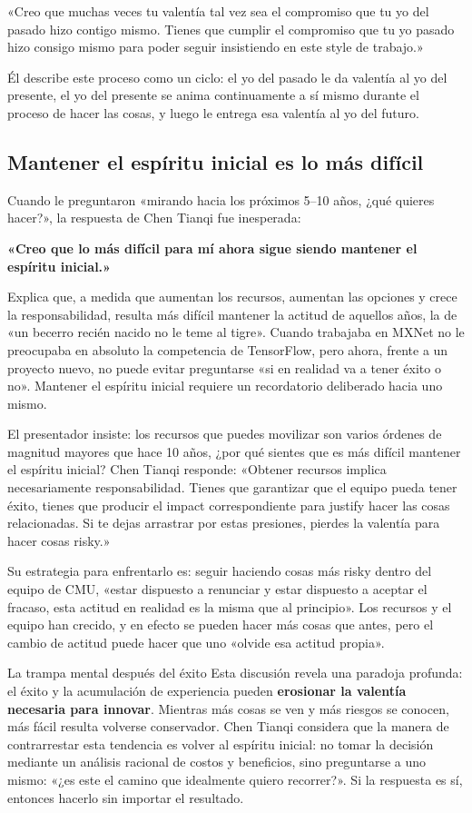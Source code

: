 «Creo que muchas veces tu valentía tal vez sea el compromiso que tu yo del pasado hizo contigo mismo. Tienes que cumplir el compromiso que tu yo pasado hizo consigo mismo para poder seguir insistiendo en este style de trabajo.»

Él describe este proceso como un ciclo: el yo del pasado le da valentía al yo del presente, el yo del presente se anima continuamente a sí mismo durante el proceso de hacer las cosas, y luego le entrega esa valentía al yo del futuro.

\subsection{Mantener el espíritu inicial es lo más difícil}

Cuando le preguntaron «mirando hacia los próximos 5--10 años, ¿qué quieres hacer?», la respuesta de Chen Tianqi fue inesperada:

\textbf{«Creo que lo más difícil para mí ahora sigue siendo mantener el espíritu inicial.»}

Explica que, a medida que aumentan los recursos, aumentan las opciones y crece la responsabilidad, resulta más difícil mantener la actitud de aquellos años, la de «un becerro recién nacido no le teme al tigre». Cuando trabajaba en MXNet no le preocupaba en absoluto la competencia de TensorFlow, pero ahora, frente a un proyecto nuevo, no puede evitar preguntarse «si en realidad va a tener éxito o no». Mantener el espíritu inicial requiere un recordatorio deliberado hacia uno mismo.

El presentador insiste: los recursos que puedes movilizar son varios órdenes de magnitud mayores que hace 10 años, ¿por qué sientes que es más difícil mantener el espíritu inicial? Chen Tianqi responde: «Obtener recursos implica necesariamente responsabilidad. Tienes que garantizar que el equipo pueda tener éxito, tienes que producir el impact correspondiente para justify hacer las cosas relacionadas. Si te dejas arrastrar por estas presiones, pierdes la valentía para hacer cosas risky.»

Su estrategia para enfrentarlo es: seguir haciendo cosas más risky dentro del equipo de CMU, «estar dispuesto a renunciar y estar dispuesto a aceptar el fracaso, esta actitud en realidad es la misma que al principio». Los recursos y el equipo han crecido, y en efecto se pueden hacer más cosas que antes, pero el cambio de actitud puede hacer que uno «olvide esa actitud propia».

\begin{warningbox}{La trampa mental después del éxito}
Esta discusión revela una paradoja profunda: el éxito y la acumulación de experiencia pueden \textbf{erosionar la valentía necesaria para innovar}. Mientras más cosas se ven y más riesgos se conocen, más fácil resulta volverse conservador. Chen Tianqi considera que la manera de contrarrestar esta tendencia es volver al espíritu inicial: no tomar la decisión mediante un análisis racional de costos y beneficios, sino preguntarse a uno mismo: «¿es este el camino que idealmente quiero recorrer?». Si la respuesta es sí, entonces hacerlo sin importar el resultado.
\end{warningbox}

